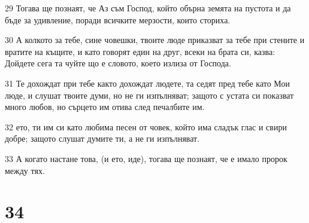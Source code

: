 \par 29 Тогава ще познаят, че Аз съм Господ, който обърна земята на пустота и да бъде за удивление, поради всичките мерзости, които сториха.
\par 30 А колкото за тебе, сине човешки, твоите люде приказват за тебе при стените и вратите на къщите, и като говорят един на друг, всеки на брата си, казва: Дойдете сега та чуйте що е словото, което излиза от Господа.
\par 31 Те дохождат при тебе както дохождат людете, та седят пред тебе като Мои люде, и слушат твоите думи, но не ги изпълняват; защото с устата си показват много любов, но сърцето им отива след печалбите им.
\par 32 ето, ти им си като любима песен от човек, който има сладък глас и свири добре; защото слушат думите ти, а не ги изпълняват.
\par 33 А когато настане това, (и ето, иде), тогава ще познаят, че е имало пророк между тях.

\chapter{34}

